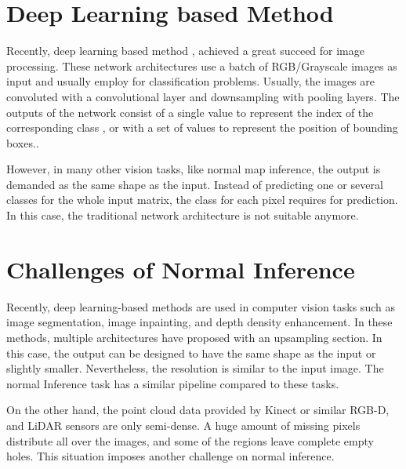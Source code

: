 
\section{Deep Learning based Method}
Recently, deep learning based method \cite{yolov3}, \cite{efficientDet} achieved a great succeed for image processing. 
These network architectures use a batch of RGB/Grayscale images as input and usually employ for classification problems. Usually, the images are convoluted with a convolutional layer and downsampling with pooling layers. The outputs of the network consist of a single value to represent the index of the corresponding class \cite{efficientDet}, or with a set of values to represent the position of bounding boxes.\cite{yolov3}.  

However, in many other vision tasks, like normal map inference, the output is demanded as the same shape as the input. Instead of predicting one or several classes for the whole input matrix, the class for each pixel requires for prediction. In this case, the traditional network architecture is not suitable anymore.



\section{Challenges of Normal Inference}

Recently, deep learning-based methods are used in computer vision tasks such as image segmentation, image inpainting, and depth density enhancement. In these methods, multiple architectures have proposed with an upsampling section. In this case, the output can be designed to have the same shape as the input or slightly smaller. Nevertheless, the resolution is similar to the input image. The normal Inference task has a similar pipeline compared to these tasks.


On the other hand, the point cloud data provided by Kinect or similar RGB-D, and LiDAR sensors are only semi-dense. A huge amount of missing pixels distribute all over the images, and some of the regions leave complete empty holes. This situation imposes another challenge on normal inference. 


